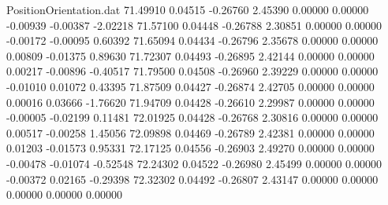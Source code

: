 \begin{filecontents}{PositionOrientation.dat}
  71.49910    0.04515   -0.26760     2.45390    0.00000    0.00000   -0.00939   -0.00387   -2.02218
  71.57100    0.04448   -0.26788     2.30851    0.00000    0.00000   -0.00172   -0.00095    0.60392
  71.65094    0.04434   -0.26796     2.35678    0.00000    0.00000    0.00809   -0.01375    0.89630
  71.72307    0.04493   -0.26895     2.42144    0.00000    0.00000    0.00217   -0.00896   -0.40517
  71.79500    0.04508   -0.26960     2.39229    0.00000    0.00000   -0.01010    0.01072    0.43395
  71.87509    0.04427   -0.26874     2.42705    0.00000    0.00000    0.00016    0.03666   -1.76620
  71.94709    0.04428   -0.26610     2.29987    0.00000    0.00000   -0.00005   -0.02199    0.11481
  72.01925    0.04428   -0.26768     2.30816    0.00000    0.00000    0.00517   -0.00258    1.45056
  72.09898    0.04469   -0.26789     2.42381    0.00000    0.00000    0.01203   -0.01573    0.95331
  72.17125    0.04556   -0.26903     2.49270    0.00000    0.00000   -0.00478   -0.01074   -0.52548
  72.24302    0.04522   -0.26980     2.45499    0.00000    0.00000   -0.00372    0.02165   -0.29398
  72.32302    0.04492   -0.26807     2.43147    0.00000    0.00000    0.00000    0.00000    0.00000
\end{filecontents}
